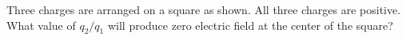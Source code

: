         Three charges are arranged on a square as shown. All
        three charges are positive. What value of $q_2/q_1$ will
        produce zero electric field at the center of the square?\answercheck
